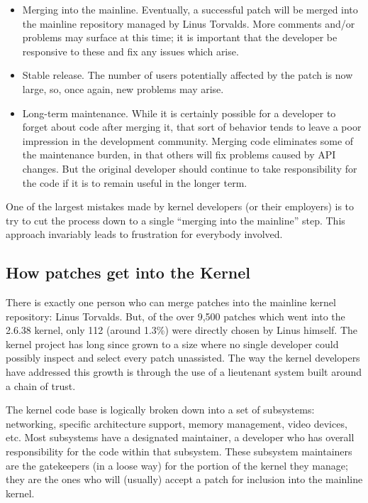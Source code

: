 \documentclass[a4paper,8pt,english]{sphinxmanual}
\begin{document}
\begin{itemize}
\item {} 
Merging into the mainline.  Eventually, a successful patch will be
merged into the mainline repository managed by Linus Torvalds.  More
comments and/or problems may surface at this time; it is important that
the developer be responsive to these and fix any issues which arise.

\item {} 
Stable release.  The number of users potentially affected by the patch
is now large, so, once again, new problems may arise.

\item {} 
Long-term maintenance.  While it is certainly possible for a developer
to forget about code after merging it, that sort of behavior tends to
leave a poor impression in the development community.  Merging code
eliminates some of the maintenance burden, in that others will fix
problems caused by API changes.  But the original developer should
continue to take responsibility for the code if it is to remain useful
in the longer term.

\end{itemize}

One of the largest mistakes made by kernel developers (or their employers)
is to try to cut the process down to a single ``merging into the mainline''
step.  This approach invariably leads to frustration for everybody
involved.


\subsection{How patches get into the Kernel}
\label{process/2.Process:how-patches-get-into-the-kernel}
There is exactly one person who can merge patches into the mainline kernel
repository: Linus Torvalds.  But, of the over 9,500 patches which went
into the 2.6.38 kernel, only 112 (around 1.3\%) were directly chosen by Linus
himself.  The kernel project has long since grown to a size where no single
developer could possibly inspect and select every patch unassisted.  The
way the kernel developers have addressed this growth is through the use of
a lieutenant system built around a chain of trust.

The kernel code base is logically broken down into a set of subsystems:
networking, specific architecture support, memory management, video
devices, etc.  Most subsystems have a designated maintainer, a developer
who has overall responsibility for the code within that subsystem.  These
subsystem maintainers are the gatekeepers (in a loose way) for the portion
of the kernel they manage; they are the ones who will (usually) accept a
patch for inclusion into the mainline kernel.
\end{document}
